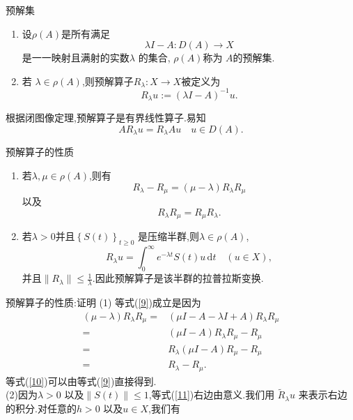 \begin{frame}[t]{预解集}
  \begin{definition}
    \begin{enumerate}
      \item 设$\rho(A)$是所有满足
	 \[
	   \lambda I-A:D(A)\to X
	\] 
	是一一映射且满射的实数$\lambda$ 的集合, $\rho(A)$称为 $A$的预解集.
      \item 若 $\lambda \in \rho(A)$,则预解算子$R_\lambda:X\to X$被定义为
	\[
	  R_\lambda u:=(\lambda I-A)^{-1}u.
	\] 
    \end{enumerate}
  \end{definition}
  根据闭图像定理,预解算子是有界线性算子.易知
  \[
    AR_\lambda u= R_\lambda A u\quad u \in D(A).
  \] 
\end{frame}

\begin{frame}[t]{预解算子的性质}
  \begin{theorem}
  	\begin{enumerate}
   	 \item 若$\lambda,\mu \in \rho(A)$,则有
     	 \begin{equation}
	   R_\lambda-R_\mu=\left( \mu-\lambda \right) R_\lambda R_\mu\label{9}
     	 \end{equation}以及
     	 \begin{equation}
	   R_\lambda R_\mu=R_\mu R_\lambda.\label{10}
     	 \end{equation}
  	 \item 若$\lambda>0$并且$\left\{S(t)\right\} _{t\ge 0}$ 是压缩半群,则$\lambda \in \rho (A)$,
     	 \begin{equation}
	   R_\lambda u = \int_0^{\infty}e^{-\lambda t}S(t)u\,\mathrm{d}t \quad (u\in X),\label{11}
     	 \end{equation}
      并且$\|R_\lambda\|\le \frac{1}{\lambda}$.因此预解算子是该半群的拉普拉斯变换.
 	 \end{enumerate}
	\end{theorem}
\end{frame}
\begin{frame}[t]{预解算子的性质:证明}
  (1) 等式(\ref{9})成立是因为
  \begin{align*}
    (\mu-\lambda)R_\lambda R_\mu = & \left( \mu I-A-\lambda I +A \right) R_\lambda R_\mu\\
    = & \left( \mu I-A \right) R_\lambda R_\mu -R_\mu\\
    =& R_\lambda (\mu I-A) R_\mu -R_\mu\\
    =& R_\lambda -R_\mu
  .\end{align*}
  等式(\ref{10})可以由等式(\ref{9})直接得到.\\
  (2)因为$\lambda>0$ 以及$\|S(t)\|\le 1$,等式(\ref{11})右边由意义.我们用 $\widetilde{R}_\lambda u$ 来表示右边的积分.对任意的$h>0$ 以及$u \in X$,我们有
\end{frame}
